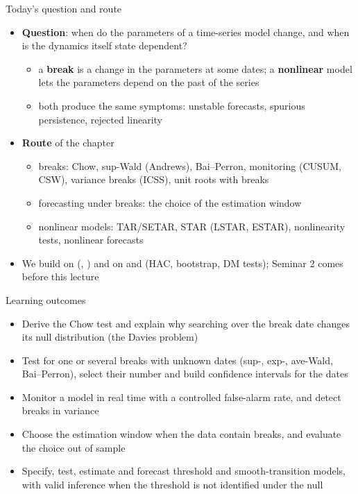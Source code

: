\begin{frame}{Today's question and route}
\itemsize{\small}
\begin{itemize}
    \item \textbf{Question}: when do the parameters of a time-series model change, and when is the dynamics itself state dependent?
    \begin{itemize}
        \item a \textbf{break} is a change in the parameters at some dates; a \textbf{nonlinear} model lets the parameters depend on the past of the series
        \item both produce the same symptoms: unstable forecasts, spurious persistence, rejected linearity
    \end{itemize}
    \item \textbf{Route} of the chapter
    \begin{itemize}
        \item breaks: Chow, sup-Wald (Andrews), Bai--Perron, monitoring (CUSUM, CSW), variance breaks (ICSS), unit roots with breaks
        \item forecasting under breaks: the choice of the estimation window
        \item nonlinear models: TAR/SETAR, STAR (LSTAR, ESTAR), nonlinearity tests, nonlinear forecasts
    \end{itemize}
    \item We build on  (, ) and on  and  (HAC, bootstrap, DM tests); Seminar 2 comes before this lecture
\end{itemize}
\end{frame}

\begin{frame}{Learning outcomes}
\itemsize{\small}
\begin{itemize}
    \item Derive the Chow test and explain why searching over the break date changes its null distribution (the Davies problem)
    \item Test for one or several breaks with unknown dates (sup-, exp-, ave-Wald, Bai--Perron), select their number and build confidence intervals for the dates
    \item Monitor a model in real time with a controlled false-alarm rate, and detect breaks in variance
    \item Choose the estimation window when the data contain breaks, and evaluate the choice out of sample
    \item Specify, test, estimate and forecast threshold and smooth-transition models, with valid inference when the threshold is not identified under the null
\end{itemize}
\end{frame}

